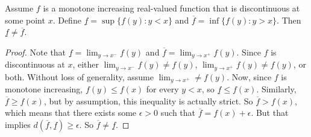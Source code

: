 \documentclass[12pt]{article}
\begin{document}
\begin{Proposition}
  Assume $f$ is a monotone increasing real-valued function that is discontinuous at some
  point $x$. Define $\underline{f} = \sup\{f(y) : y < x\}$ and $\overline{f} =
  \inf\{f(y) : y > x\}$. Then $\underline{f} \neq \overline{f}$.
\end{Proposition}
\begin{proof}
  Note that $\underline{f} = \lim_{y\rightarrow x^{-}}f(y)$ and $\overline{f} =
  \lim_{y\rightarrow x^{+}}f(y)$. Since $f$ is discontinuous at $x$, either
  $\lim_{y\rightarrow x^{-}}f(y) \neq f(y)$, $\lim_{y\rightarrow x^{+}}f(y) \neq
  f(y)$, or both. Without loss of generality, assume $\lim_{y\rightarrow
  x^{+}}\neq f(y)$. Now, since $f$ is monotone increasing, $f(y) \leq f(x)$
  for every $y < x$, so $\underline{f} \leq f(x)$. Similarly, $\overline{f} \geq
  f(x)$, but by assumption, this inequality is actually strict. So $\overline{f}
  > f(x)$, which means that there exists some $\epsilon > 0$ such that
  $\overline{f} = f(x) + \epsilon$. But that implies $d(\overline{f},
  \underline{f}) \geq \epsilon$. So $\overline{f} \neq \underline{f}$.
\end{proof}
\end{document}
